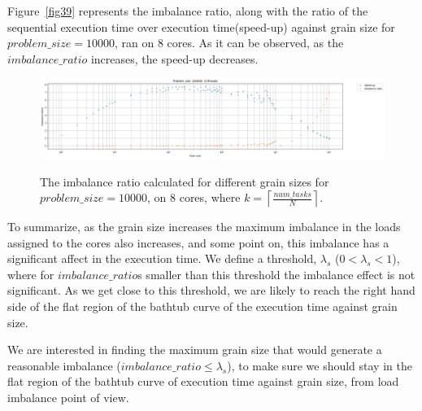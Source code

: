 
Figure~\ref{fig39} represents the imbalance ratio, along with the ratio of the sequential execution time over execution time(speed-up) against grain size for $problem\_size=10000$, ran on 8 cores.   
As it can be observed, as the $imbalance\_{ratio}$ increases, the speed-up decreases. 

\vspace{\baselineskip}	
\begin{figure}[H]
	\centering
	{\includegraphics[scale=.3]{images/hpx_for_loop/w_c_speedup.png}}
	\caption{The imbalance ratio calculated for different grain sizes for $problem\_size=10000$, on 8 cores, where $k=\left\lceil{\frac{num\_{tasks}}{N}}\right \rceil$.}\label{fig37}		
\end{figure}


To summarize, as the grain size increases the maximum imbalance in the loads assigned to the cores also increases, and some point on, this imbalance has a significant affect in the execution time. We define a threshold, $\lambda_s$ ($0<\lambda_s<1$), where for $imbalance\_{ratio}$s smaller than this threshold the imbalance effect is not significant. As we get close to this threshold, we are likely to reach the right hand side of the flat region of the bathtub curve of the execution time against grain size. 


We are interested in finding the maximum grain size that would generate a reasonable imbalance ($imbalance\_{ratio}\leq{\lambda_s}$), to make sure we should stay in the flat region of the bathtub curve of execution time against grain size, from load imbalance point of view.  

